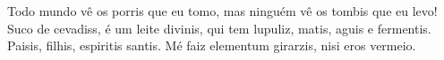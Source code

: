 \documentclass[a4paper]{twentysecondcv} %
\begin{document}
Todo mundo vê os porris que eu tomo, mas ninguém vê os tombis que eu levo! Suco de cevadiss, é um leite divinis, qui tem lupuliz, matis, aguis e fermentis. Paisis, filhis, espiritis santis. Mé faiz elementum girarzis, nisi eros vermeio.










\end{document}
